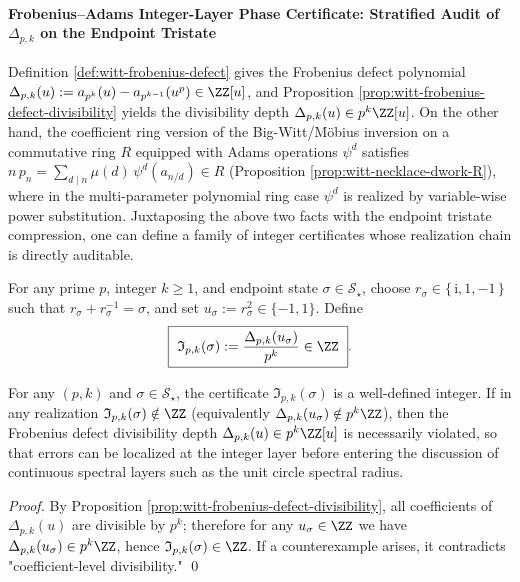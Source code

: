 \paragraph{Frobenius--Adams Integer-Layer Phase Certificate: Stratified Audit of \texorpdfstring{$\Delta_{p,k}$}{Delta} on the Endpoint Tristate}
Definition \ref{def:witt-frobenius-defect} gives the Frobenius defect polynomial
\(
\Delta_{p,k}(u):=a_{p^k}(u)-a_{p^{k-1}}(u^p)\in\ZZ[u]
\),
and Proposition \ref{prop:witt-frobenius-defect-divisibility} yields the divisibility depth
\(
\Delta_{p,k}(u)\in p^k\ZZ[u]
\).
On the other hand, the coefficient ring version of the Big-Witt/M\"obius inversion on a commutative ring \(R\) equipped with Adams operations \(\psi^d\) satisfies
\(
n\,p_n=\sum_{d\mid n}\mu(d)\,\psi^d(a_{n/d})\in R
\)
(Proposition \ref{prop:witt-necklace-dwork-R}), where in the multi-parameter polynomial ring case \(\psi^d\) is realized by variable-wise power substitution.
Juxtaposing the above two facts with the endpoint tristate compression, one can define a family of integer certificates whose realization chain is directly auditable.

\begin{definition}\label{def:endpoint-frobenius-integer-certificate}
For any prime \(p\), integer \(k\ge 1\), and endpoint state \(\sigma\in\mathcal S_{\star}\), choose \(r_\sigma\in\{\,\mathrm{i},1,-1\,\}\) such that \(r_\sigma+r_\sigma^{-1}=\sigma\), and set \(u_\sigma:=r_\sigma^{2}\in\{-1,1\}\).
Define
\begin{equation}\label{eq:endpoint-frobenius-integer-certificate}
\boxed{\ \mathfrak I_{p,k}(\sigma):=\frac{\Delta_{p,k}(u_{\sigma})}{p^{k}}\in\ZZ\ }.
\end{equation}
\end{definition}

\begin{proposition}\label{prop:endpoint-frobenius-integer-certificate-auditable}
For any \((p,k)\) and \(\sigma\in\mathcal S_{\star}\), the certificate \(\mathfrak I_{p,k}(\sigma)\) is a well-defined integer.
If in any realization \(\mathfrak I_{p,k}(\sigma)\notin\ZZ\) (equivalently \(\Delta_{p,k}(u_\sigma)\notin p^k\ZZ\)), then the Frobenius defect divisibility depth \(\Delta_{p,k}(u)\in p^k\ZZ[u]\) is necessarily violated, so that errors can be localized at the integer layer before entering the discussion of continuous spectral layers such as the unit circle spectral radius.
\end{proposition}
\begin{proof}
By Proposition \ref{prop:witt-frobenius-defect-divisibility}, all coefficients of \(\Delta_{p,k}(u)\) are divisible by \(p^k\); therefore for any \(u_\sigma\in\ZZ\) we have \(\Delta_{p,k}(u_\sigma)\in p^k\ZZ\), hence \(\mathfrak I_{p,k}(\sigma)\in\ZZ\).
If a counterexample arises, it contradicts "coefficient-level divisibility." \qed
\end{proof}
